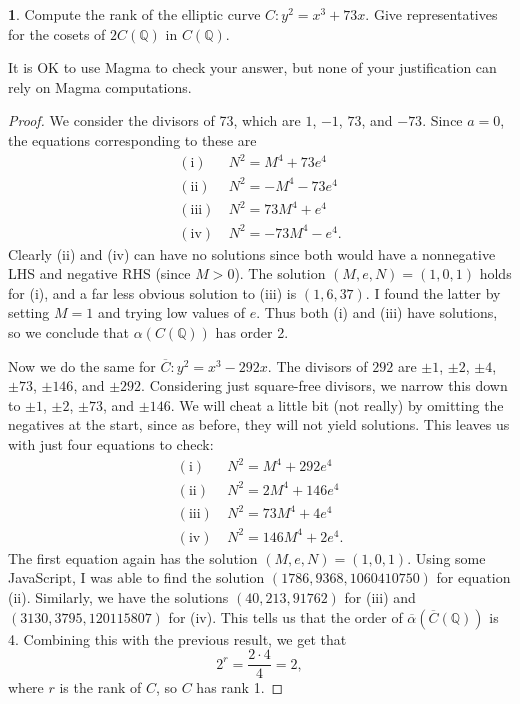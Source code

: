 \documentclass[12pt]{article}
\newcommand{\Q}{\mathbb{Q}}
\theoremstyle{definition}
\newtheorem{ex}{}
\begin{document}
\begin{ex}
	Compute the rank of the elliptic curve $C : y^{2} = x^{3} + 73x$. Give representatives for the cosets of
	$2C(\Q)$ in $C(\Q)$.

	It is OK to use Magma to check your answer, but none of your justification can rely
	on Magma computations.
\end{ex}
\begin{proof}
	We consider the divisors of 73, which are $1$, $-1$, $73$, and $-73$.
	Since $a = 0$, the equations corresponding to these are \begin{align*}
		(\text{i})   & \ N^2 = M^4 + 73e^4   \\
		(\text{ii})  & \ N^2 = -M^4 - 73e^4  \\
		(\text{iii}) & \ N^2 = 73M^4 + e^4   \\
		(\text{iv})  & \ N^2 = -73M^4 - e^4.
	\end{align*}
	Clearly (ii) and (iv) can have no solutions since both would have a nonnegative LHS and negative RHS (since $M > 0$).
	The solution $(M, e, N) = (1, 0, 1)$ holds for (i), and a far less obvious solution to (iii) is $(1, 6, 37)$.
	I found the latter by setting $M = 1$ and trying low values of $e$.
	Thus both (i) and (iii) have solutions, so we conclude that $\alpha(C(\mathbb{Q}))$ has order 2.

	Now we do the same for $\overline{C}: y^2 = x^3 - 292x$.
	The divisors of $292$ are $\pm 1$, $\pm 2$, $\pm 4$, $\pm 73$, $\pm 146$, and $\pm 292$.
	Considering just square-free divisors, we narrow this down to $\pm 1$, $\pm 2$, $\pm 73$, and $\pm 146$.
	We will cheat a little bit (not really) by omitting the negatives at the start, since as before, they will not yield solutions.
	This leaves us with just four equations to check: \begin{align*}
		(\text{i})   & \ N^2 = M^4 + 292e^4   \\
		(\text{ii})  & \ N^2 = 2M^4 + 146e^4  \\
		(\text{iii}) & \ N^2 = 73M^4 + 4e^4   \\
		(\text{iv})  & \ N^2 = 146M^4 + 2e^4.
	\end{align*}
	The first equation again has the solution $(M, e, N) = (1, 0, 1)$.
	Using some JavaScript, I was able to find the solution $(1786, 9368, 1060410750)$ for equation (ii).
	Similarly, we have the solutions $(40, 213, 91762)$ for (iii) and $(3130, 3795, 120115807)$ for (iv).
	This tells us that the order of $\overline{\alpha}(\overline{C}(\mathbb{Q}))$ is 4.
	Combining this with the previous result, we get that \begin{equation*}
		2^r = \frac{2 \cdot 4}{4} = 2,
	\end{equation*}
	where $r$ is the rank of $C$, so $C$ has rank 1.


\end{proof}
\end{document}
